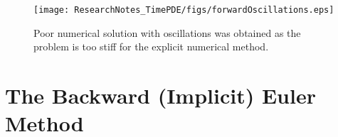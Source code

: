 \begin{figure}
\centering
\texttt{[image: ResearchNotes\_TimePDE/figs/forwardOscillations.eps]}
\caption{Poor numerical solution with oscillations was obtained as the problem is too stiff for the explicit numerical method.}
\label{fig:falseOscillation}
\end{figure}

\section{The Backward (Implicit) Euler Method}

